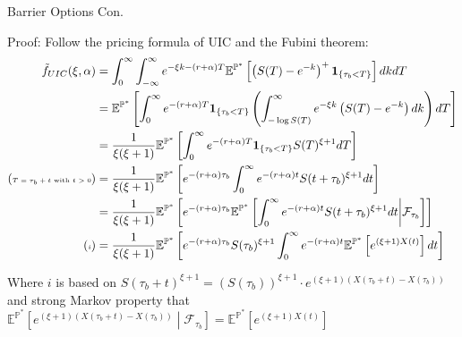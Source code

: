 \documentclass{beamer}
\begin{document}
\begin{frame}{Barrier Options Con.}

    {\footnotesize \scriptsize
    \par Proof: Follow the pricing formula of UIC and the Fubini theorem:
    \begin{align*}
        \tilde{f}_{UIC}(\xi, \alpha) &= \int_{0}^{\infty} \int_{-\infty}^{\infty} e^{-\xi k - (r + \alpha) T}
         \mathbb{E}^{\mathbb{P}^*} \left[ \left( S(T) - e^{-k} \right)^+ \mathbf{1}_{\{\tau_b < T\}} \right] dkdT\\
        & = \mathbb{E}^{\mathbb{P}^*} \left[ \int_{0}^{\infty} e^{-(r + \alpha) T} \mathbf{1}_{\{\tau_b < T\}}
          \left( \int_{-\log S(T)}^{\infty} e^{-\xi k} \left( S(T) - e^{-k} \right) dk \right) dT \right]\\
          &= \frac{1}{\xi (\xi + 1)} \mathbb{E}^{\mathbb{P}^*} \left[ \int_{0}^{\infty} e^{-(r + \alpha) T} \mathbf{1}_{\{\tau_b < T\}} S(T)^{\xi + 1} dT \right]\\
          {\footnotesize \tiny(\text{$T = \tau_b + t$ with $t>0$})} &=\frac{1}{\xi (\xi + 1)} \mathbb{E}^{\mathbb{P}^*} \left[ e^{-(r + \alpha) \tau_b} \int_{0}^{\infty} e^{-(r + \alpha) t} S(t + \tau_b)^{\xi + 1} 
          dt \right]\\
          &=\frac{1}{\xi (\xi + 1)} \mathbb{E}^{\mathbb{P}^*} \left[ e^{-(r + \alpha) \tau_b} 
            \mathbb{E}^ {\mathbb{P}^*} \left[ \int_{0}^{\infty} e^{-(r + \alpha) t} S(t + \tau_b)^{\xi + 1} dt \middle| \mathcal{F}_{\tau_b} \right] 
           \right]\\
           {\footnotesize \tiny(\text{$i$})}&=\frac{1}{\xi (\xi + 1)} \mathbb{E}^{\mathbb{P}^*} \left[ e^{-(r + \alpha) \tau_b} 
            S(\tau_b)^{\xi+1} \int_0^\infty e^{-(r+\alpha)t} \mathbb{E}^{\mathbb{P}^*} \left[ e^{(\xi+1)X(t)} \right]  dt 
           \right]\\
    \end{align*}
    \vspace{-2em}
    \par Where $i$ is based on $S(\tau_b + t)^{\xi+1} = \left(S(\tau_b)\right)^{\xi+1} \cdot e^{(\xi+1)(X(\tau_b + t) - X(\tau_b))}$ and 
    strong Markov property that $\mathbb{E}^{\mathbb{P}^*} \left[ e^{(\xi+1)(X(\tau_b + t) - X(\tau_b))} \middle| \mathcal{F}_{\tau_b} \right] 
    = \mathbb{E}^{\mathbb{P}^*} \left[ e^{(\xi+1)X(t)} \right]$
    
    }
\end{frame}
\end{document}
